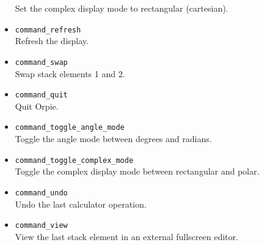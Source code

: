 \documentclass[11pt,notitlepage]{article}
\begin{document}
\begin{itemize}
      Set the complex display mode to rectangular (cartesian).
   \item {\tt command\_refresh} \\
      Refresh the display.
   \item {\tt command\_swap} \\
      Swap stack elements 1 and 2.
   \item {\tt command\_quit} \\
      Quit Orpie.
   \item {\tt command\_toggle\_angle\_mode} \\
      Toggle the angle mode between degrees and radians.
   \item {\tt command\_toggle\_complex\_mode} \\
      Toggle the complex display mode between rectangular and polar.
   \item {\tt command\_undo} \\
      Undo the last calculator operation.
   \item {\tt command\_view} \\
      View the last stack element in an external fullscreen editor.
\end{itemize}
\end{document}
